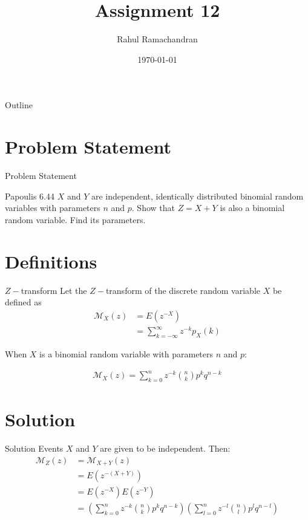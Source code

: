 \documentclass{beamer}
\title{Assignment 12}
\author{Rahul Ramachandran}
\date{\today}
\providecommand{\brak}[1]{\ensuremath{\left(#1\right)}}
\begin{document}
\begin{frame}
    \titlepage 
\end{frame}

\logo{}


\begin{frame}{Outline}
    \tableofcontents
\end{frame}



\section{Problem Statement}
\begin{frame}{Problem Statement}
    \begin{block}{Papoulis 6.44}  $X$ and $Y$ are independent, identically distributed binomial random variables with parameters $n$ and $p$. Show that $Z = X + Y$ is also a binomial random variable. Find its parameters. \end{block}
\end{frame}

\section{Definitions}
\begin{frame}{$Z-$transform}
 Let the $Z-$transform of the discrete random variable $X$ be defined as
 \begin{align}
     \mathcal{M}_X(z) &= E(z^{-X}) \\
                      &= \sum_{k=-\infty} ^\infty {z^{-k} p_X(k)}
 \end{align}
 
    When $X$ is a binomial random variable with parameters $n$ and $p$:
    
 \begin{align}
     \mathcal{M}_X(z) = \sum_{k=0} ^n {z^{-k} \binom{n}{k} p^k q^{n-k}} 
 \end{align}                   
 
    

\end{frame}


\section{Solution}
\begin{frame}{Solution}
 Events $X$ and $Y$ are given to be independent. Then:
 \begin{align}
      \mathcal{M}_Z(z) &= \mathcal{M}_{X+Y}(z) \\
      &= E(z^{-(X+Y)}) \\
      &=  E(z^{-X}) E(z^{-Y}) \\
      \label{eq7}
      &= \brak{\sum_{k=0} ^n {z^{-k} \binom{n}{k} p^k q^{n-k}}} \brak{ \sum_{l=0} ^n {z^{-l} \binom{n}{l} p^l q^{n-l}} }
 \end{align}
\end{frame}
\end{document}
